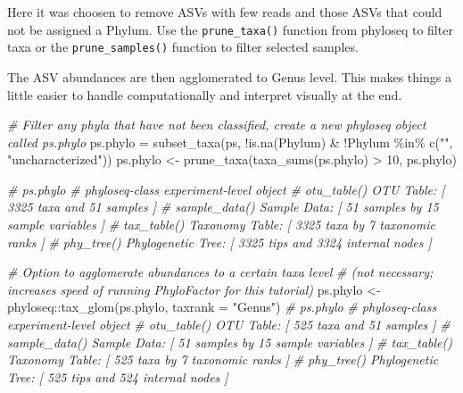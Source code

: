 \documentclass[
]{book}
\newenvironment{Shaded}{\begin{snugshade}}{\end{snugshade}}
\newcommand{\AttributeTok}[1]{\textcolor[rgb]{0.77,0.63,0.00}{#1}}
\newcommand{\CommentTok}[1]{\textcolor[rgb]{0.56,0.35,0.01}{\textit{#1}}}
\newcommand{\DecValTok}[1]{\textcolor[rgb]{0.00,0.00,0.81}{#1}}
\newcommand{\FunctionTok}[1]{\textcolor[rgb]{0.00,0.00,0.00}{#1}}
\newcommand{\NormalTok}[1]{#1}
\newcommand{\OtherTok}[1]{\textcolor[rgb]{0.56,0.35,0.01}{#1}}
\newcommand{\SpecialCharTok}[1]{\textcolor[rgb]{0.00,0.00,0.00}{#1}}
\newcommand{\StringTok}[1]{\textcolor[rgb]{0.31,0.60,0.02}{#1}}
\begin{document}
Here it was choosen to remove ASVs with few reads and those ASVs that could not be assigned a Phylum. Use the \texttt{prune\_taxa()} function from phyloseq to filter taxa or the \texttt{prune\_samples()} function to filter selected samples.

The ASV abundances are then agglomerated to Genus level. This makes things a little easier to handle computationally and interpret visually at the end.

\begin{Shaded}
\begin{Highlighting}[]
\CommentTok{\# Filter any phyla that have not been classified, create a new phyloseq object called ps.phylo}
\NormalTok{ps.phylo }\OtherTok{=} \FunctionTok{subset\_taxa}\NormalTok{(ps, }\SpecialCharTok{!}\FunctionTok{is.na}\NormalTok{(Phylum) }\SpecialCharTok{\&} \SpecialCharTok{!}\NormalTok{Phylum }\SpecialCharTok{\%in\%} \FunctionTok{c}\NormalTok{(}\StringTok{""}\NormalTok{, }\StringTok{"uncharacterized"}\NormalTok{))}
\NormalTok{ps.phylo }\OtherTok{\textless{}{-}} \FunctionTok{prune\_taxa}\NormalTok{(}\FunctionTok{taxa\_sums}\NormalTok{(ps.phylo)  }\SpecialCharTok{\textgreater{}} \DecValTok{10}\NormalTok{, ps.phylo)}

\CommentTok{\# ps.phylo }
\CommentTok{\# phyloseq{-}class experiment{-}level object}
\CommentTok{\# otu\_table()   OTU Table:         [ 3325 taxa and 51 samples ]}
\CommentTok{\# sample\_data() Sample Data:       [ 51 samples by 15 sample variables ]}
\CommentTok{\# tax\_table()   Taxonomy Table:    [ 3325 taxa by 7 taxonomic ranks ]}
\CommentTok{\# phy\_tree()    Phylogenetic Tree: [ 3325 tips and 3324 internal nodes ]}

\CommentTok{\# Option to agglomerate abundances to a certain taxa level }
\CommentTok{\# (not necessary; increases speed of running PhyloFactor for this tutorial)}
\NormalTok{ps.phylo }\OtherTok{\textless{}{-}}\NormalTok{ phyloseq}\SpecialCharTok{::}\FunctionTok{tax\_glom}\NormalTok{(ps.phylo, }\AttributeTok{taxrank =} \StringTok{"Genus"}\NormalTok{)  }
\CommentTok{\# ps.phylo  }
\CommentTok{\# phyloseq{-}class experiment{-}level object}
\CommentTok{\# otu\_table()   OTU Table:         [ 525 taxa and 51 samples ]}
\CommentTok{\# sample\_data() Sample Data:       [ 51 samples by 15 sample variables ]}
\CommentTok{\# tax\_table()   Taxonomy Table:    [ 525 taxa by 7 taxonomic ranks ]}
\CommentTok{\# phy\_tree()    Phylogenetic Tree: [ 525 tips and 524 internal nodes ]}
\end{Highlighting}
\end{Shaded}
\end{document}

